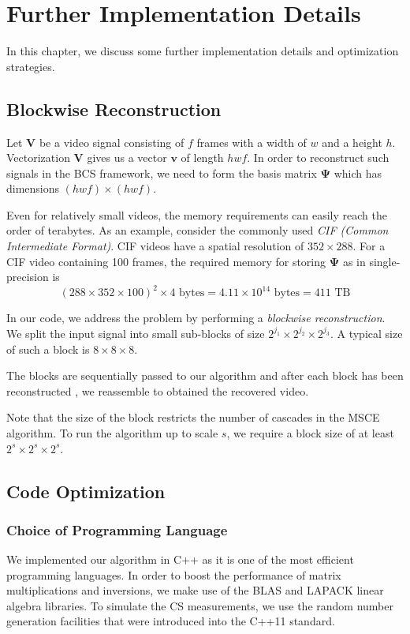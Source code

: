 \chapter{Further Implementation Details}
\label{ch:code}
In this chapter, we discuss some further implementation details and optimization strategies.

\section{Blockwise Reconstruction}
Let $\bm V$ be a video signal consisting of $f$ frames with a width of $w$ and a height $h$.
Vectorization $\bm V$ gives us a vector $\bm v$ of length $hwf$.
In order to reconstruct such signals in the BCS framework, we need to form the basis matrix $\bm\Psi$ which has dimensions $(hwf)\times (hwf)$.

Even for relatively small videos, the memory requirements can easily reach the order of terabytes.
As an example, consider the commonly used \emph{CIF (Common Intermediate Format)}.
CIF videos have a spatial resolution of $352 \times 288$.
For a CIF video containing 100 frames, the required memory for storing $\bm\Psi$ as in single-precision is
\begin{equation*}
(288\times 352\times 100)^2 \times 4 \mbox{ bytes} = 4.11 \times 10^{14} \mbox{ bytes} = 411 \mbox{ TB}
\end{equation*}

In our code, we address the problem by performing a \emph{blockwise reconstruction}.
We split the input signal into small sub-blocks of size $2^{j_1}\times 2^{j_2}\times 2^{j_3}$.
A typical size of such a block is $8\times 8\times 8$.

The blocks are sequentially passed to our algorithm and after each block has been reconstructed , we reassemble to obtained the recovered video.

Note that the size of the block restricts the number of cascades in the MSCE algorithm.
To run the algorithm up to scale $s$, we require a block size of at least $2^s\times 2^s\times 2^s$.

\section{Code Optimization}

\subsection{Choice of Programming Language}
We implemented our algorithm in C++ as it is one of the most efficient programming languages.
In order to boost the performance of matrix multiplications and inversions, we make use of the BLAS and LAPACK linear algebra libraries.
To simulate the CS measurements, we use the random number generation facilities that were introduced into the C++11 standard.

